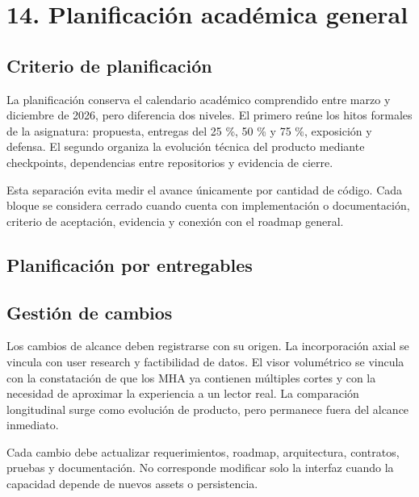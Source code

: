 \chapter{14. Planificación académica general}
\label{chap:planificacion-academica}

\section{Criterio de planificación}

La planificación conserva el calendario académico comprendido entre marzo y diciembre de 2026, pero diferencia dos niveles. El primero reúne los hitos formales de la asignatura: propuesta, entregas del 25 \%, 50 \% y 75 \%, exposición y defensa. El segundo organiza la evolución técnica del producto mediante checkpoints, dependencias entre repositorios y evidencia de cierre.

Esta separación evita medir el avance únicamente por cantidad de código. Cada bloque se considera cerrado cuando cuenta con implementación o documentación, criterio de aceptación, evidencia y conexión con el roadmap general.

\section{Planificación por entregables}


\section{Gestión de cambios}

Los cambios de alcance deben registrarse con su origen. La incorporación axial se vincula con user research y factibilidad de datos. El visor volumétrico se vincula con la constatación de que los MHA ya contienen múltiples cortes y con la necesidad de aproximar la experiencia a un lector real. La comparación longitudinal surge como evolución de producto, pero permanece fuera del alcance inmediato.

Cada cambio debe actualizar requerimientos, roadmap, arquitectura, contratos, pruebas y documentación. No corresponde modificar solo la interfaz cuando la capacidad depende de nuevos assets o persistencia.

